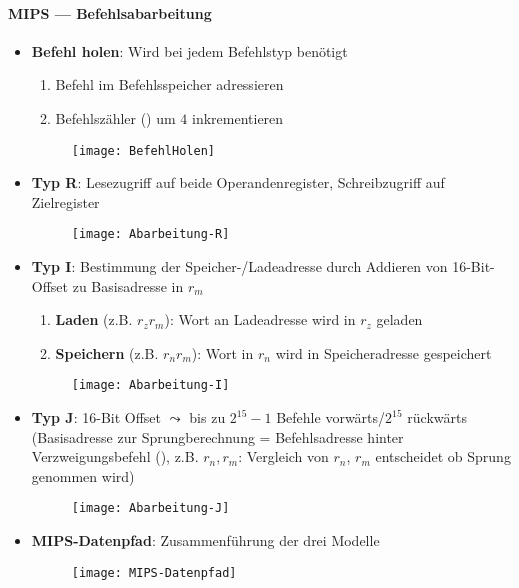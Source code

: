 \paragraph{MIPS  --- Befehlsabarbeitung}
\begin{itemize}
  \item \textbf{Befehl holen}: Wird bei jedem Befehlstyp benötigt
  \begin{enumerate}
    \item Befehl im Befehlsspeicher adressieren
    \item Befehlszähler () um \( 4 \) inkrementieren
  \end{enumerate}
  \begin{figure}[H]\centering\label{BefehlHolen}\texttt{[image: BefehlHolen]}\end{figure}

  \item \textbf{Typ R}: Lesezugriff auf beide Operandenregister, Schreibzugriff auf Zielregister
  \begin{figure}[H]\centering\label{Abarbeitung-R}\texttt{[image: Abarbeitung-R]}\end{figure}

  \item \textbf{Typ I}: Bestimmung der Speicher-/Ladeadresse durch Addieren von 16-Bit-Offset zu Basisadresse in \( r_m \)
  \begin{enumerate}
    \item \textbf{Laden} (z.B.  \( r_z \)\( r_m \)\code{)}): Wort an Ladeadresse wird in \( r_z \) geladen
    \item \textbf{Speichern} (z.B.  \( r_n \)\( r_m \)\code{)}): Wort in \( r_n \) wird in Speicheradresse gespeichert
  \end{enumerate}
  \begin{figure}[H]\centering\label{Abarbeitung-I}\texttt{[image: Abarbeitung-I]}\end{figure}

  \item \textbf{Typ J}: 16-Bit Offset \( \leadsto \) bis zu \( 2^{15}-1 \) Befehle vorwärts/\( 2^{15} \) rückwärts (Basisadresse zur Sprungberechnung = Befehlsadresse hinter Verzweigungsbefehl (), z.B.  \( r_n, r_m \): Vergleich von \( r_n \), \( r_m \) entscheidet ob Sprung genommen wird)
  \begin{figure}[H]\centering\label{Abarbeitung-J}\texttt{[image: Abarbeitung-J]}\end{figure}

  \item \textbf{MIPS-Datenpfad}: Zusammenführung der drei Modelle
  \begin{figure}[H]\centering\label{MIPS-Datenpfad}\texttt{[image: MIPS-Datenpfad]}\end{figure}
\end{itemize}

